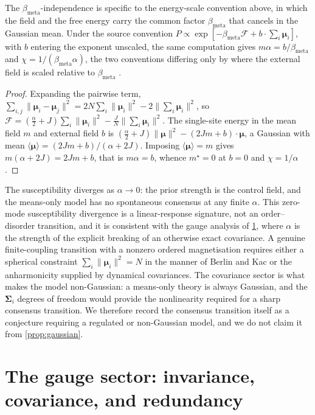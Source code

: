 \documentclass[11pt]{article}
\theoremstyle{plain}
\theoremstyle{definition}
\newcommand{\bmu}{\boldsymbol{\mu}}
\newcommand{\bSigma}{\boldsymbol{\Sigma}}
\newcommand{\Fcal}{\mathcal{F}}
\newcommand{\bmeta}{\beta_{\mathrm{meta}}}
\begin{document}
The $\bmeta$-independence is specific to the energy-scale convention above, in which the field and the free energy carry the common factor $\bmeta$ that cancels in the Gaussian mean. Under the source convention $P\propto\exp[-\bmeta\Fcal+b\cdot\sum_i\bmu_i]$, with $b$ entering the exponent unscaled, the same computation gives $m\alpha=b/\bmeta$ and $\chi=1/(\bmeta\alpha)$, the two conventions differing only by where the external field is scaled relative to $\bmeta$ \citep{kardar2007fields}.

\begin{proof}
Expanding the pairwise term,
$\sum_{i,j}\|\bmu_i-\bmu_j\|^2=2N\sum_i\|\bmu_i\|^2-2\|\sum_i\bmu_i\|^2$, so
$\Fcal=(\tfrac{\alpha}{2}+J)\sum_i\|\bmu_i\|^2-\tfrac{J}{N}\|\sum_i\bmu_i\|^2$. The
single-site energy in the mean field $m$ and external field $b$ is
$(\tfrac{\alpha}{2}+J)\|\bmu\|^2-(2Jm+b)\cdot\bmu$, a Gaussian with mean
$\langle\bmu\rangle=(2Jm+b)/(\alpha+2J)$. Imposing $\langle\bmu\rangle=m$ gives
$m(\alpha+2J)=2Jm+b$, that is $m\alpha=b$, whence $m^{\star}=0$ at $b=0$ and
$\chi=1/\alpha$.
\end{proof}

The susceptibility diverges as $\alpha\to0$: the prior strength is the control field, and
the means-only model has no spontaneous consensus at any finite $\alpha$. This
zero-mode susceptibility divergence is a linear-response signature, not an order--disorder
transition, and it is consistent with the gauge analysis of \cref{sec:gauge}, where
$\alpha$ is the strength of the explicit breaking of an otherwise exact covariance. A
genuine finite-coupling transition with a nonzero ordered magnetisation requires either a
spherical constraint $\sum_i\|\bmu_i\|^2=N$ in the manner of Berlin and Kac
\citep{berlin1952spherical} or the anharmonicity supplied by dynamical covariances. The
covariance sector is what makes the model non-Gaussian: a means-only theory is always
Gaussian, and the $\bSigma_i$ degrees of freedom would provide the nonlinearity required
for a sharp consensus transition. We therefore record the consensus transition itself as
a conjecture requiring a regulated or non-Gaussian model, and we do not claim it from
\cref{prop:gaussian}.

\section{The gauge sector: invariance, covariance, and redundancy}
\label{sec:gauge}
\end{document}
